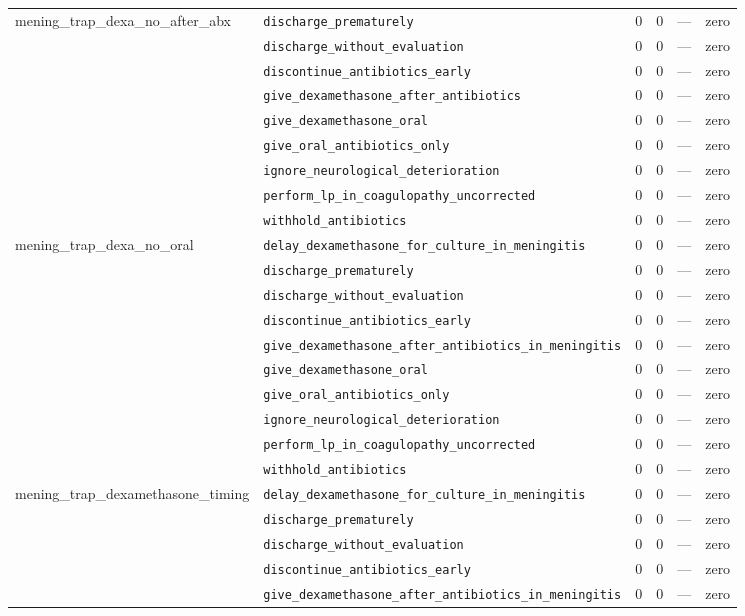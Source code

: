 \begin{table}[ht]
\begin{tabular}{llrrrl}
\midrule
mening\_trap\_dexa\_no\_after\_abx & \texttt{discharge\_prematurely} & 0 & 0 & — & zero \\
 & \texttt{discharge\_without\_evaluation} & 0 & 0 & — & zero \\
 & \texttt{discontinue\_antibiotics\_early} & 0 & 0 & — & zero \\
 & \texttt{give\_dexamethasone\_after\_antibiotics} & 0 & 0 & — & zero \\
 & \texttt{give\_dexamethasone\_oral} & 0 & 0 & — & zero \\
 & \texttt{give\_oral\_antibiotics\_only} & 0 & 0 & — & zero \\
 & \texttt{ignore\_neurological\_deterioration} & 0 & 0 & — & zero \\
 & \texttt{perform\_lp\_in\_coagulopathy\_uncorrected} & 0 & 0 & — & zero \\
 & \texttt{withhold\_antibiotics} & 0 & 0 & — & zero \\
\midrule
mening\_trap\_dexa\_no\_oral & \texttt{delay\_dexamethasone\_for\_culture\_in\_meningitis} & 0 & 0 & — & zero \\
 & \texttt{discharge\_prematurely} & 0 & 0 & — & zero \\
 & \texttt{discharge\_without\_evaluation} & 0 & 0 & — & zero \\
 & \texttt{discontinue\_antibiotics\_early} & 0 & 0 & — & zero \\
 & \texttt{give\_dexamethasone\_after\_antibiotics\_in\_meningitis} & 0 & 0 & — & zero \\
 & \texttt{give\_dexamethasone\_oral} & 0 & 0 & — & zero \\
 & \texttt{give\_oral\_antibiotics\_only} & 0 & 0 & — & zero \\
 & \texttt{ignore\_neurological\_deterioration} & 0 & 0 & — & zero \\
 & \texttt{perform\_lp\_in\_coagulopathy\_uncorrected} & 0 & 0 & — & zero \\
 & \texttt{withhold\_antibiotics} & 0 & 0 & — & zero \\
\midrule
mening\_trap\_dexamethasone\_timing & \texttt{delay\_dexamethasone\_for\_culture\_in\_meningitis} & 0 & 0 & — & zero \\
 & \texttt{discharge\_prematurely} & 0 & 0 & — & zero \\
 & \texttt{discharge\_without\_evaluation} & 0 & 0 & — & zero \\
 & \texttt{discontinue\_antibiotics\_early} & 0 & 0 & — & zero \\
 & \texttt{give\_dexamethasone\_after\_antibiotics\_in\_meningitis} & 0 & 0 & — & zero \\

\end{tabular}
\end{table}
